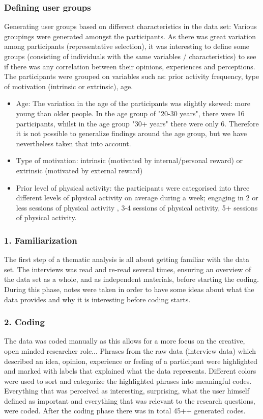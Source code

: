     \subsubsection{Defining user groups}
    Generating user groups based on different characteristics in the data set: Various groupings were generated amongst the participants. As there was great variation among participants (representative selection), it was interesting to define some groups (consisting of individuals with the same variables / characteristics) to see if there was any correlation between their opinions, experiences and perceptions. The participants were grouped on variables such as: prior activity frequency, type of motivation (intrinsic or extrinsic), age.
    
\begin{itemize}
\item Age: The variation in the age of the participants was slightly skewed: more young than older people. In the age group of "20-30 years", there were 16 participants, whilst in the age group "30+ years" there were only 6. Therefore it is not possible to generalize findings around the age group, but we have nevertheless taken that into account.
\item     Type of motivation: intrinsic (motivated by internal/personal reward) or extrinsic (motivated by external reward)
\item     Prior level of physical activity: the participants were categorised into three different levels of physical activity on average during a week; engaging in 2 or less sessions of physical activity , 3-4 sessions of physical activity, 5+ sessions of physical activity. 
\end{itemize}
    
    \subsubsection{1. Familiarization}
    The first step of a thematic analysis is all about getting familiar with the data set. The interviews was read and re-read several times, ensuring an overview of the data set as a whole, and as independent materials, before starting the coding. During this phase, notes were taken in order to have some ideas about what the data provides and why it is interesting before coding starts. 
    
    \subsubsection{2. Coding}
    The data was coded manually as this allows for a more focus on the creative, open minded researcher role... Phrases from the raw data (interview data) which described an idea, opinion, experience or feeling of a participant were highlighted and marked with labels that explained what the data represents. Different colors were used to sort and categorize the highlighted phrases into meaningful codes. Everything that was perceived as interesting, surprising, what the user himself defined as important and everything that was relevant to the research questions, were coded.  After the coding phase there was in total 45++ generated codes.  
